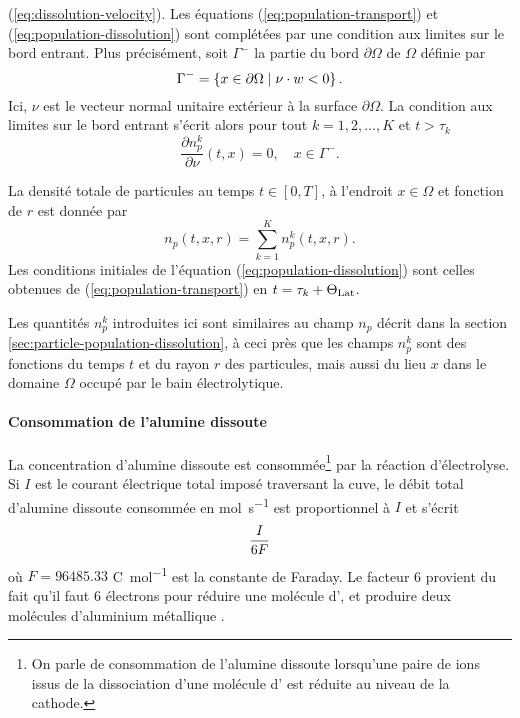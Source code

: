 (\ref{eq:dissolution-velocity}). Les équations
(\ref{eq:population-transport}) et (\ref{eq:population-dissolution})
sont complétées par une condition aux limites sur le bord entrant. Plus
précisément, soit $\Gamma^-$ la partie du bord $\partial \Omega$ de $\Omega$
définie par
\begin{equation}\label{eq:np-bc}
  \Gamma^- = \left\{ x\in\partial\Omega \mid \nu \cdot  w
  < 0 \right\}.
\end{equation}
Ici, $\nu$ est le vecteur normal unitaire extérieur à la surface
$\partial \Omega$. La condition aux limites sur le bord entrant s'écrit
alors pour tout $k = 1, 2, \dots, K$ et $t > \tau_k$
\begin{equation}
\frac{\partial n_p^k}{\partial \nu}(t, x) = 0, \quad x\in\Gamma^-.
\end{equation}

La densité totale de particules au temps $t \in [0, T]$, à l'endroit
$x\in\Omega$ et fonction de $r$ est donnée par
\begin{equation}
  n_p(t, x, r) = \sum_{k=1}^K n_p^k(t, x, r).
\end{equation}
Les conditions initiales de l'équation
(\ref{eq:population-dissolution}) sont celles obtenues de
(\ref{eq:population-transport}) en $t = \tau_k + \Theta_\text{Lat}$.

\begin{remarque}
Les quantités $n_p^k$ introduites ici sont similaires au champ $n_p$
décrit dans la section \ref{sec:particle-population-dissolution}, à
ceci près que les champs $n_p^k$ sont des fonctions du temps $t$ et du
rayon $r$ des particules, mais aussi du lieu $x$ dans le domaine
$\Omega$ occupé par le bain électrolytique.
\end{remarque}

\paragraph{Consommation de l'alumine dissoute}
La concentration d'alumine dissoute est consommée\footnote{On parle de
consommation de l'alumine dissoute lorsqu'une paire de ions  issus de
la dissociation d'une molécule d' est réduite au niveau de
la cathode.} par la réaction
d'électrolyse. Si $I$ est le courant électrique total imposé
traversant la cuve, le débit total d'alumine dissoute consommée en
\si{\mol\per\second} est proportionnel à $I$ et s'écrit
\begin{equation}
  \frac{I}{6F}
\end{equation}
où $F = \num{96485.33}$ \si{\coulomb\per\mol} est la constante de
Faraday. Le facteur \num{6} provient du fait qu'il
faut \num{6} électrons pour réduire une molécule d', et
produire deux molécules d'aluminium métallique .

